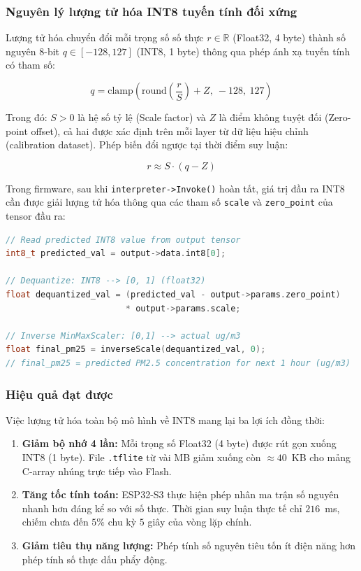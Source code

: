 \documentclass[12pt,a4paper]{article}
\begin{document}
\subsubsection{Nguyên lý lượng tử hóa INT8 tuyến tính đối xứng}

Lượng tử hóa chuyển đổi mỗi trọng số số thực $r \in \mathbb{R}$ (Float32, 4 byte) thành số nguyên 8-bit $q \in [-128, 127]$ (INT8, 1 byte) thông qua phép ánh xạ tuyến tính có tham số:

\begin{equation}
    q = \text{clamp}\!\left(\text{round}\!\left(\frac{r}{S}\right) + Z,\ -128,\ 127\right)
    \label{eq:quantize}
\end{equation}

Trong đó: $S > 0$ là hệ số tỷ lệ (Scale factor) và $Z$ là điểm không tuyệt đối (Zero-point offset), cả hai được xác định trên mỗi layer từ dữ liệu hiệu chỉnh (calibration dataset). Phép biến đổi ngược tại thời điểm suy luận:

\begin{equation}
    r \approx S \cdot (q - Z)
    \label{eq:dequantize}
\end{equation}

Trong firmware, sau khi \texttt{interpreter->Invoke()} hoàn tất, giá trị đầu ra INT8 cần được giải lượng tử hóa thông qua các tham số \texttt{scale} và \texttt{zero\_point} của tensor đầu ra:

\begin{lstlisting}[caption={Dequantize LSTM output and restore actual PM2.5 value}, language=C++]
// Read predicted INT8 value from output tensor
int8_t predicted_val = output->data.int8[0];

// Dequantize: INT8 --> [0, 1] (float32)
float dequantized_val = (predicted_val - output->params.zero_point)
                        * output->params.scale;

// Inverse MinMaxScaler: [0,1] --> actual ug/m3
float final_pm25 = inverseScale(dequantized_val, 0);
// final_pm25 = predicted PM2.5 concentration for next 1 hour (ug/m3)
\end{lstlisting}

\subsubsection{Hiệu quả đạt được}

Việc lượng tử hóa toàn bộ mô hình về INT8 mang lại ba lợi ích đồng thời:
\begin{enumerate}
    \item \textbf{Giảm bộ nhớ 4 lần:} Mỗi trọng số Float32 (4 byte) được rút gọn xuống INT8 (1 byte). File \texttt{.tflite} từ vài MB giảm xuống còn $\approx 40$~KB cho mảng C-array nhúng trực tiếp vào Flash.
    \item \textbf{Tăng tốc tính toán:} ESP32-S3 thực hiện phép nhân ma trận số nguyên nhanh hơn đáng kể so với số thực. Thời gian suy luận thực tế chỉ $216$~ms, chiếm chưa đến $5\%$ chu kỳ $5$ giây của vòng lặp chính.
    \item \textbf{Giảm tiêu thụ năng lượng:} Phép tính số nguyên tiêu tốn ít điện năng hơn phép tính số thực dấu phẩy động.
\end{enumerate}
\end{document}
